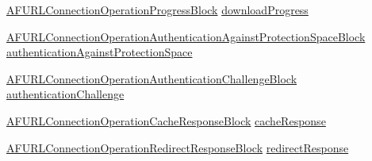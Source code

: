 \begin{DoxyCompactItemize}
\item 
\hyperlink{_a_f_u_r_l_connection_operation_8m_a8522dd3ddf39be65563f1225357677d0}{A\-F\-U\-R\-L\-Connection\-Operation\-Progress\-Block} \hyperlink{category_a_f_u_r_l_connection_operation_07_08_a2530110594741aa405724fe3d65228be}{download\-Progress}
\item 
\hyperlink{_a_f_u_r_l_connection_operation_8m_a62b1ba26e702f499e35acbfb0535a47b}{A\-F\-U\-R\-L\-Connection\-Operation\-Authentication\-Against\-Protection\-Space\-Block} \hyperlink{category_a_f_u_r_l_connection_operation_07_08_a866ee8f38c7bbe3ae41040fb6ab24176}{authentication\-Against\-Protection\-Space}
\item 
\hyperlink{_a_f_u_r_l_connection_operation_8m_a2cea16107d055ba51251e0b5161e12b7}{A\-F\-U\-R\-L\-Connection\-Operation\-Authentication\-Challenge\-Block} \hyperlink{category_a_f_u_r_l_connection_operation_07_08_a5434bfc8e3d49e5a3f5593608772eb81}{authentication\-Challenge}
\item 
\hyperlink{_a_f_u_r_l_connection_operation_8m_a326c476a5efb11eda5ee64ee17976bd4}{A\-F\-U\-R\-L\-Connection\-Operation\-Cache\-Response\-Block} \hyperlink{category_a_f_u_r_l_connection_operation_07_08_aadc13584209a85e46794bf1aaa063581}{cache\-Response}
\item 
\hyperlink{_a_f_u_r_l_connection_operation_8m_aba804ce20535fafc20d17239873d8a94}{A\-F\-U\-R\-L\-Connection\-Operation\-Redirect\-Response\-Block} \hyperlink{category_a_f_u_r_l_connection_operation_07_08_a91653021425e07347c28dc02dc650082}{redirect\-Response}
\end{DoxyCompactItemize}


